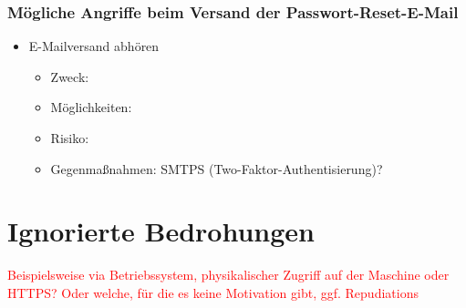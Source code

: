 \documentclass[12pt,DIV14,BCOR10mm,a4paper,twoside,parskip=half-,headsepline,headinclude,english,ngerman,bibliography=totocnumbered]{scrreprt}
\begin{document}
\subsubsection{Mögliche Angriffe beim Versand der Passwort-Reset-E-Mail}

\begin{itemize}
\item E-Mailversand abhören
  \begin{itemize}
  \item Zweck:
  \item Möglichkeiten:
  \item Risiko:
  \item Gegenmaßnahmen: SMTPS (Two-Faktor-Authentisierung)?
  \end{itemize}
\end{itemize}

\section{Ignorierte Bedrohungen}

\textcolor{red}{
Beispielsweise via Betriebssystem, physikalischer Zugriff auf der Maschine oder HTTPS?
Oder welche, für die es keine Motivation gibt, ggf. Repudiations
}

\printacronyms[title=Abkürzungsverzeichnis,toctitle=Abkürzungsverzeichnis]
\printglossary[type=main]

\listoffigures      %

\end{document}
